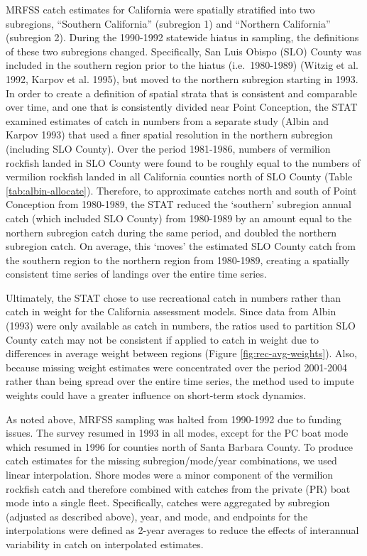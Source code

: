 \documentclass[11pt,
  english,
]{article}
\begin{document}
MRFSS catch estimates for California were spatially stratified into two subregions, ``Southern California'' (subregion 1) and ``Northern California'' (subregion 2). During the 1990-1992 statewide hiatus in sampling, the definitions of these two subregions changed. Specifically, San Luis Obispo (SLO) County was included in the southern region prior to the hiatus (i.e.~1980-1989) {(Witzig et al. 1992, Karpov et al. 1995)\leavevmode\tagmcend\tagstructend}, but moved to the northern subregion starting in 1993. In order to create a definition of spatial strata that is consistent and comparable over time, and one that is consistently divided near Point Conception, the STAT examined estimates of catch in numbers from a separate study {(Albin and Karpov 1993)\leavevmode\tagmcend\tagstructend} that used a finer spatial resolution in the northern subregion (including SLO County). Over the period 1981-1986, numbers of vermilion rockfish landed in SLO County were found to be roughly equal to the numbers of vermilion rockfish landed in all California counties north of SLO County (Table \ref{tab:albin-allocate}). Therefore, to approximate catches north and south of Point Conception from 1980-1989, the STAT reduced the `southern' subregion annual catch (which included SLO County) from 1980-1989 by an amount equal to the northern subregion catch during the same period, and doubled the northern subregion catch. On average, this `moves' the estimated SLO County catch from the southern region to the northern region from 1980-1989, creating a spatially consistent time series of landings over the entire time series.

Ultimately, the STAT chose to use recreational catch in numbers rather than catch in weight for the California assessment models. Since data from Albin {(1993)\leavevmode\tagmcend\tagstructend} were only available as catch in numbers, the ratios used to partition SLO County catch may not be consistent if applied to catch in weight due to differences in average weight between regions (Figure \ref{fig:rec-avg-weights}). Also, because missing weight estimates were concentrated over the period 2001-2004 rather than being spread over the entire time series, the method used to impute weights could have a greater influence on short-term stock dynamics.

As noted above, MRFSS sampling was halted from 1990-1992 due to funding issues. The survey resumed in 1993 in all modes, except for the PC boat mode which resumed in 1996 for counties north of Santa Barbara County. To produce catch estimates for the missing subregion/mode/year combinations, we used linear interpolation. Shore modes were a minor component of the vermilion rockfish catch and therefore combined with catches from the private (PR) boat mode into a single fleet. Specifically, catches were aggregated by subregion (adjusted as described above), year, and mode, and endpoints for the interpolations were defined as 2-year averages to reduce the effects of interannual variability in catch on interpolated estimates.
\end{document}
